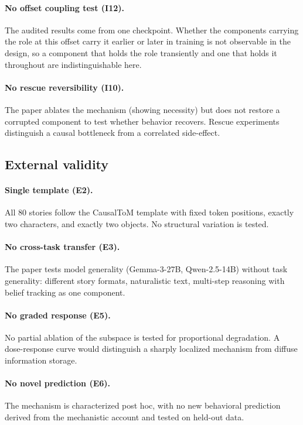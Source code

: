 \documentclass{article}
\begin{document}
\paragraph{No offset coupling test (I12).}
The audited results come from one checkpoint. Whether the components carrying the role at
this offset carry it earlier or later in training is not observable in the design, so a
component that holds the role transiently and one that holds it throughout are
indistinguishable here.

\paragraph{No rescue reversibility (I10).}
The paper ablates the mechanism (showing necessity) but does not restore a corrupted component to test whether behavior recovers. Rescue experiments distinguish a causal bottleneck from a correlated side-effect.

\subsection{External validity}

\paragraph{Single template (E2).}
All 80 stories follow the CausalToM template with fixed token positions, exactly two characters, and exactly two objects. No structural variation is tested.

\paragraph{No cross-task transfer (E3).}
The paper tests model generality (Gemma-3-27B, Qwen-2.5-14B) without task generality: different story formats, naturalistic text, multi-step reasoning with belief tracking as one component.

\paragraph{No graded response (E5).}
No partial ablation of the subspace is tested for proportional degradation. A dose-response curve would distinguish a sharply localized mechanism from diffuse information storage.

\paragraph{No novel prediction (E6).}
The mechanism is characterized post hoc, with no new behavioral prediction derived from the mechanistic account and tested on held-out data.
\end{document}
